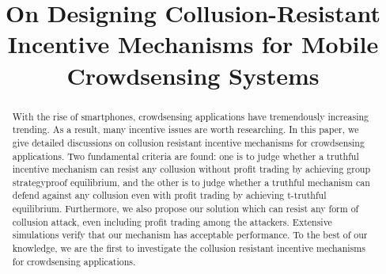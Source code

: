 \documentclass[conference]{IEEEtran}
\theoremstyle{definition}
\begin{document}
\title{On Designing Collusion-Resistant Incentive Mechanisms for Mobile Crowdsensing Systems}
\author{
}
\maketitle

{\color{black}
\begin{abstract}

With the rise of smartphones, crowdsensing applications have tremendously increasing trending. As a result, many incentive issues are worth researching. In this paper, we give detailed discussions on collusion resistant incentive mechanisms for crowdsensing applications. Two fundamental criteria are found: one is to judge whether a truthful incentive mechanism can resist any collusion without profit trading by achieving group strategyproof equilibrium, and the other is to judge whether a truthful mechanism can defend against any collusion even with 
profit trading by achieving t-truthful equilibrium. Furthermore, we also propose our solution which can resist any form of collusion attack, even including profit trading among the attackers. {\color{blue}Extensive simulations verify that our mechanism has acceptable performance}. To the best of our knowledge, we are the first to investigate the collusion resistant incentive mechanisms for crowdsensing applications.
\end{abstract}
}
\end{document}

